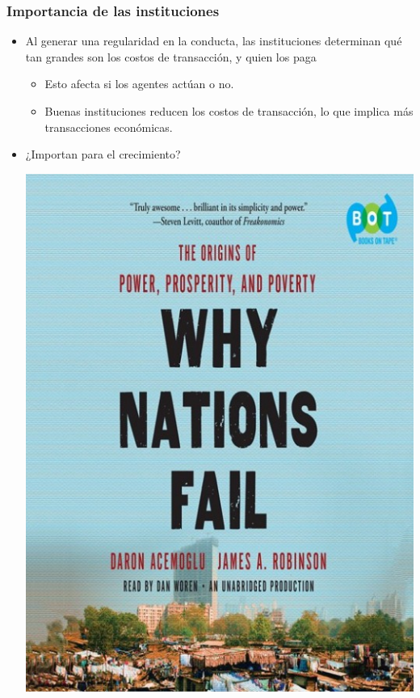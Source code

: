 \documentclass{beamer}
\begin{document}
\begin{frame}
\frametitle{Importancia de las instituciones}
\begin{itemize}
    \item Al generar una regularidad en la conducta, las instituciones determinan qué tan grandes son los costos de transacción, y quien los paga
    \begin{itemize}
        \item Esto afecta si los agentes actúan o no.
        \item Buenas instituciones reducen los costos de transacción, lo que implica más transacciones económicas.
    \end{itemize}
    \item ¿Importan para el crecimiento?
    

    \begin{center}
        \includegraphics[scale=0.2]{../Figures/Why-Nations-Fail.jpg}
    \end{center}
\end{itemize}
\end{frame}
\end{document}
